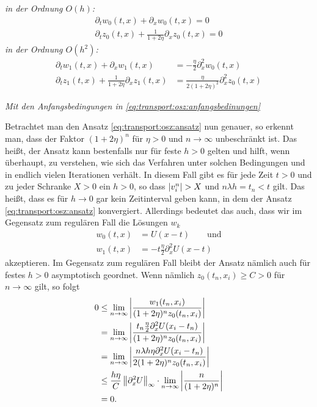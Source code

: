 \vspace{0.4cm}
\noindent \emph{in der Ordnung $O(h)$:}
\begin{align}
\partial_t w_0(t, x) + \partial_x w_0(t, x) = 0 \label{eq:transport:osz:oh_A}\\
\partial_t z_0(t, x) + \frac {1} {1 + 2\eta} \partial_x z_0(t, x) = 0 \label{eq:transport:osz:oh_B}
\end{align}
\vspace{0.4cm}
\noindent \emph{in der Ordnung $O(h^2)$:}
\begin{align}\label{eq:transport:osz:oh2_A}
\partial_t w_1(t, x) + \partial_x w_1(t, x) &= - \frac {\eta}{2} \partial^2_x w_0(t, x)\\
\partial_t z_1(t, x) + \frac{1}{1 + 2 \eta} \partial_x z_1(t, x) &= \frac{\eta}{2 (1 + 2 \eta)^2} \partial^2_x z_0(t, x) \label{eq:transport:osz:oh2_B}
\end{align}

\noindent \emph{Mit den Anfangsbedingungen in \eqref{eq:transport:osz:anfangsbedinungen}}


\vspace{0.4cm}
Betrachtet man den Ansatz \eqref{eq:transport:osz:ansatz} nun genauer, so erkennt man, dass der Faktor $(1 + 2 \eta)^n$ für $\eta > 0$ und $n \to \infty$ unbeschränkt ist.
Das heißt, der Ansatz kann bestenfalls nur für feste $h > 0$ gelten und hilft, wenn überhaupt, zu verstehen, wie sich das Verfahren unter solchen Bedingungen und in endlich vielen Iterationen verhält.
In diesem Fall gibt es für jede Zeit $t > 0$ und zu jeder Schranke $X > 0$ ein $h > 0$, so dass $\left| v^n_i \right| > X$ und $n \lambda h = t_n < t$ gilt.
Das heißt, dass es für $h \to 0$ gar kein Zeitinterval geben kann, in dem der Ansatz \eqref{eq:transport:osz:ansatz} konvergiert. 
Allerdings bedeutet das auch, dass wir im Gegensatz zum regulären Fall die Lösungen $w_k$
\begin{align}\label{eq:transport:osz:wk_loesungen}
w_0(t, x) &= U(x - t) \qquad \text{und}\\
w_1(t, x) &= - t \frac{\eta} 2 \partial^2_x U(x - t)
\end{align}
akzeptieren.
Im Gegensatz zum regulären Fall bleibt der Ansatz nämlich auch für festes $h > 0$ asymptotisch geordnet.
Wenn nämlich $z_0(t_n, x_i) \geq C > 0$ für $n \to \infty$ gilt, so folgt
\begin{align*}
0 &\leq \lim_{n \to \infty} \left| \frac{w_1(t_n,x_i)}{(1 + 2 \eta)^n z_0(t_n, x_i)} \right|\\
&= \lim_{n \to \infty} \left| \frac{t_n \frac{\eta} 2 \partial^2_x U(x_i - t_n)}{(1 + 2 \eta)^n z_0(t_n, x_i)} \right|\\
&= \lim_{n \to \infty} \left| \frac{n \lambda h \eta \partial^2_x U(x_i - t_n)}{2 (1 + 2 \eta)^{n} z_0(t_n, x_i)} \right|\\
&\leq \frac{h \eta}{C} \left\lVert \partial^2_x U \right\rVert_\infty \cdot \lim_{n \to \infty} \left| \frac{n}{(1 + 2 \eta)^{n}} \right|\\
&= 0.
\end{align*}


